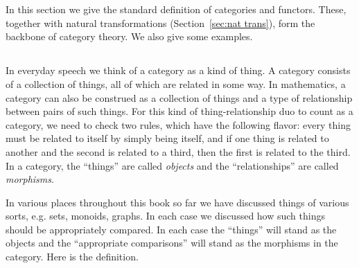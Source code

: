 \documentclass[CT4S-EN-RU]{subfiles}
\begin{document}
\section{}

\begin{blockENG}
In this section we give the standard definition of categories and functors. These, together with natural transformations (Section~\ref{sec:nat trans}), form the backbone of category theory. We also give some examples.
\end{blockENG}

\begin{blockRUS}
\end{blockRUS}


\subsection{}\label{sec:categories}

\begin{blockENG}
In everyday speech we think of a category as a kind of thing. A category consists of a collection of things, all of which are related in some way. In mathematics, a category can also be construed as a collection of things and a type of relationship between pairs of such things. For this kind of thing-relationship duo to count as a category, we need to check two rules, which have the following flavor: every thing must be related to itself by simply being itself, and if one thing is related to another and the second is related to a third, then the first is related to the third. In a category, the “things” are called {\em objects} and the “relationships” are called {\em morphisms}.
\end{blockENG}

\begin{blockRUS}
\end{blockRUS}

\begin{blockENG}
In various places throughout this book so far we have discussed things of various sorts, e.g. sets, monoids, graphs. In each case we discussed how such things should be appropriately compared. In each case the “things” will stand as the objects and the “appropriate comparisons” will stand as the morphisms in the category. Here is the definition.
\end{blockENG}
\end{document}
